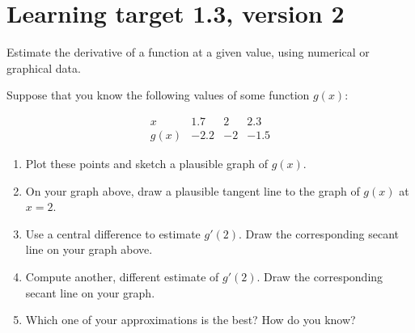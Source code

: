 \pagebreak

\section{Learning target 1.3, version 2}

Estimate the derivative of a function at a given value, using numerical or graphical data.

\hrulefill


\everymath{\displaystyle}

Suppose that you know the following values of some function $g(x)$:

\[
\begin{array}{c||r|r|r}
      x  &  1.7 &  2   &  2.3 \\\hline
    g(x) & -2.2 & -2   & -1.5
\end{array}
\]
\begin{enumerate}[leftmargin=0pt]

\item Plot these points and sketch a plausible graph of $g(x)$.


\item On your graph above, draw a plausible tangent line to the graph of $g(x)$ at $x=2$.

\item Use a central difference to estimate $g'(2)$. Draw the corresponding secant line on your graph above.

\vfill

\item Compute another, different estimate of $g'(2)$. Draw the corresponding secant line on your graph.

\vfill

\item Which one of your approximations is the best? How do you know?

\vspace{1cm}

\end{enumerate}

